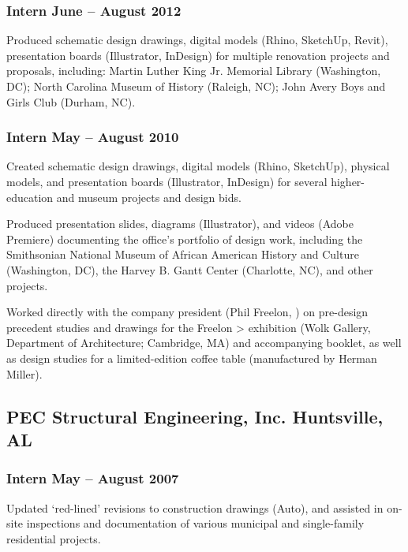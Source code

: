 \documentclass[letterpaper, oneside, 10pt]{article}
\begin{document}
\subsubsection*{Intern\DotSep{0.25em} June -- August 2012}

Produced schematic design drawings, digital models (Rhino, SketchUp, Revit),
presentation boards (Illustrator, InDesign) for multiple renovation projects
and proposals, including: Martin Luther King Jr. Memorial Library (Washington,
DC); North Carolina Museum of History (Raleigh, NC); John Avery Boys and Girls
Club (Durham, NC).


\subsubsection*{Intern\DotSep{0.25em} May -- August 2010}

Created schematic design drawings, digital models (Rhino, SketchUp), physical
models, and presentation boards (Illustrator, InDesign) for several
higher-education and museum projects and design bids.

Produced presentation slides, diagrams (Illustrator), and videos (Adobe
Premiere) documenting the office’s portfolio of design work, including the
Smithsonian National Museum of African American History and Culture
(Washington, DC), the Harvey B. Gantt Center (Charlotte, NC), and
other projects.

Worked directly with the company president (Phil Freelon, ) on
pre-design precedent studies and drawings for the Freelon > 
exhibition (Wolk Gallery,  Department of Architecture; Cambridge, MA)
and accompanying booklet, as well as design studies for a limited-edition
coffee table (manufactured by Herman Miller).


\subsection*{PEC Structural Engineering, Inc.\DotSep{0.25em} Huntsville, AL}

\subsubsection*{Intern\DotSep{0.25em} May -- August 2007}

Updated `red-lined' revisions to construction drawings (Auto), and
assisted in on-site inspections and documentation of various municipal and
single-family residential projects.
\end{document}
